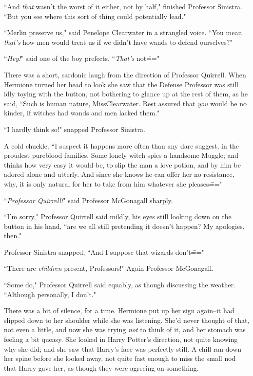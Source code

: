``And \emph{that} wasn't the worst of it either, not by half," finished Professor Sinistra. ``But you see where this sort of thing could potentially lead."

``Merlin preserve us," said Penelope Clearwater in a strangled voice. ``You mean \emph{that's} how men would treat us if we didn't have wands to defend ourselves?"

``\emph{Hey!}" said one of the boy prefects. ``\emph{That's} not\==="

There was a short, sardonic laugh from the direction of Professor Quirrell. When Hermione turned her head to look she saw that the Defense Professor was still idly toying with the button, not bothering to glance up at the rest of them, as he said, ``Such is human nature, Miss\?Clearwater. Rest assured that \emph{you} would be no kinder, if witches had wands and men lacked them."

``I hardly think so!" snapped Professor Sinistra.

A cold chuckle. ``I suspect it happens more often than any dare suggest, in the proudest pureblood families. Some lonely witch spies a handsome Muggle; and thinks how very easy it would be, to slip the man a love potion, and by him be adored alone and utterly. And since she knows he can offer her no resistance, why, it is only natural for her to take from him whatever she pleases\==="

``\emph{Professor Quirrell!}" said Professor McGonagall sharply.

``I'm sorry," Professor Quirrell said mildly, his eyes still looking down on the button in his hand, ``are we all still pretending it doesn't happen? My apologies, then."

Professor Sinistra snapped, ``And I suppose that wizards don't\==="

``There are \emph{children} present, Professors!" Again Professor McGonagall.

``Some do," Professor Quirrell said equably, as though discussing the weather. ``Although personally, I don't."

There was a bit of silence, for a time. Hermione put up her sign again\---it had slipped down to her shoulder while she was listening. She'd never thought of that, not even a little, and now she was trying \emph{not} to think of it, and her stomach was feeling a bit queasy. She looked in Harry Potter's direction, not quite knowing why she did; and she saw that Harry's face was perfectly still. A chill ran down her spine before she looked away, not quite fast enough to miss the small nod that Harry gave her, as though they were agreeing on something.

